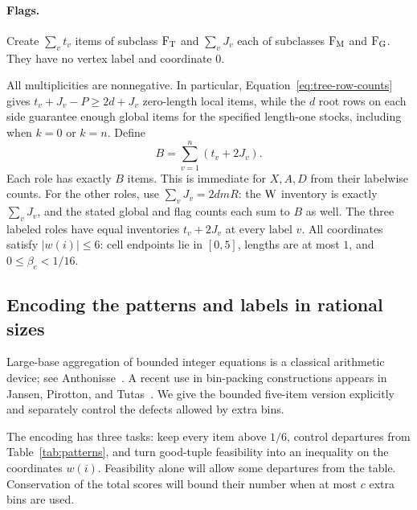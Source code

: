 \paragraph{Flags.}
Create $\sum_vt_v$ items of subclass $\mathrm{F}_{\mathrm T}$ and $\sum_vJ_v$ each of
subclasses $\mathrm{F}_{\mathrm M}$ and $\mathrm{F}_{\mathrm G}$. They have no vertex label and coordinate
$0$.

All multiplicities are nonnegative. In particular,
Equation~\eqref{eq:tree-row-counts} gives
$t_v+J_v-P\ge2d+J_v$ zero-length local items, while the $d$ root rows
on each side guarantee enough global items for the specified length-one
stocks, including when $k=0$ or $k=n$. Define
\begin{equation}\label{eq:inventory-total}
 B=\sum_{v=1}^n(t_v+2J_v).
\end{equation}
Each role has exactly $B$ items. This is immediate for $X,A,D$ from
their labelwise counts. For the other roles, use
$\sum_vJ_v=2dmR$: the $\mathrm{W}$ inventory is exactly $\sum_vJ_v$, and
the stated global and flag counts each sum to $B$ as well. The three
labeled roles have equal inventories $t_v+2J_v$ at every label $v$.
All coordinates satisfy $|w(i)|\le6$: cell endpoints lie in $[0,5]$,
lengths are at most $1$, and $0\le\beta_e<1/16$.

\subsection{Encoding the patterns and labels in rational sizes}

Large-base aggregation of bounded integer equations is a classical
arithmetic device; see Anthonisse~\cite[Theorem~6 and Section~5]{Anthonisse1973}.
A recent use in bin-packing constructions appears in
Jansen, Pirotton, and Tutas~\cite[Section~3]{JansenPirottonTutas2025}.
We give the bounded five-item version explicitly and separately control
the defects allowed by extra bins.

The encoding has three tasks: keep every item above $1/6$, control
departures from Table~\ref{tab:patterns}, and turn good-tuple feasibility
into an inequality on the coordinates $w(i)$. Feasibility alone will
allow some departures from the table. Conservation of the total scores
will bound their number when at most $c$ extra bins are used.

